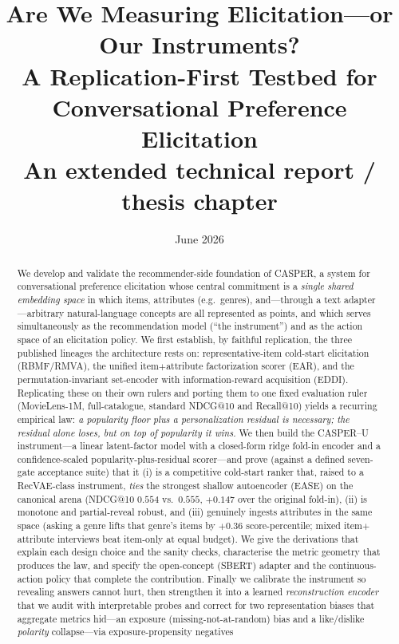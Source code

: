 \documentclass[11pt]{article}
\title{\textbf{Are We Measuring Elicitation---or Our Instruments?\\A Replication-First Testbed for Conversational Preference Elicitation}\\[4pt]\large An extended technical report / thesis chapter}
\author{}
\date{June 2026}
\begin{document}
\maketitle

\begin{abstract}
\noindent We develop and validate the recommender-side foundation of CASPER, a system for conversational
preference elicitation whose central commitment is a \emph{single shared embedding space} in which items,
attributes (e.g.\ genres), and---through a text adapter---arbitrary natural-language concepts are all
represented as points, and which serves simultaneously as the recommendation model (``the instrument'') and as
the action space of an elicitation policy. We first establish, by faithful replication, the three published
lineages the architecture rests on: representative-item cold-start elicitation (RBMF/RMVA), the unified
item$+$attribute factorization scorer (EAR), and the permutation-invariant set-encoder with information-reward
acquisition (EDDI). Replicating these on their own rulers and porting them to one fixed evaluation ruler
(MovieLens-1M, full-catalogue, standard NDCG@10 and Recall@10) yields a recurring empirical law: \emph{a
popularity floor plus a personalization residual is necessary; the residual alone loses, but on top of
popularity it wins.} We then build the CASPER--U instrument---a linear latent-factor model with a closed-form
ridge fold-in encoder and a confidence-scaled popularity-plus-residual scorer---and prove (against a defined
seven-gate acceptance suite) that it (i) is a competitive cold-start ranker that, raised to a RecVAE-class instrument,
\emph{ties} the strongest shallow autoencoder (EASE) on the canonical arena (NDCG@10 $0.554$ vs.\ $0.555$, $+0.147$ over
the original fold-in), (ii) is monotone and partial-reveal robust, and (iii) genuinely ingests
attributes in the same space (asking a genre lifts that genre's items by $+0.36$ score-percentile; mixed
item$+$attribute interviews beat item-only at equal budget). We give the derivations that explain each design
choice and the sanity checks, characterise the metric geometry that produces the law, and specify the
open-concept (SBERT) adapter and the continuous-action policy that complete the contribution. Finally we calibrate
the instrument so revealing answers cannot hurt, then strengthen it into a learned \emph{reconstruction encoder}
that we audit with interpretable probes and correct for two representation biases that aggregate metrics hid---an
exposure (missing-not-at-random) bias and a like/dislike \emph{polarity} collapse---via exposure-propensity negatives

\end{abstract}
\end{document}
